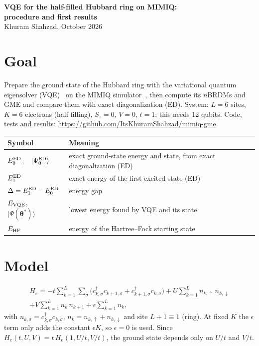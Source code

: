 \documentclass[11pt,a4paper]{article}
\newcommand{\cd}{c^\dagger}
\newcommand{\up}{\uparrow}
\newcommand{\dn}{\downarrow}
\begin{document}
\begin{center}
{\large\bfseries VQE for the half-filled Hubbard ring on MIMIQ:\\ procedure and first results}\\[6pt]
Khuram Shahzad, October 2026
\end{center}

\section{Goal}

Prepare the ground state of the Hubbard ring with the
variational quantum eigensolver (VQE)~\cite{peruzzo} on the MIMIQ simulator~\cite{mimiq}, then compute its
$n$BRDMs and GME and compare them with exact diagonalization (ED).
System: $L = 6$ sites, $K = 6$ electrons (half filling), $S_z = 0$, $V = 0$,
$t = 1$; this needs 12 qubits. Code, tests and results:
\url{https://github.com/ItsKhuramShahzad/mimiq-gme}.

\begin{center}
{\renewcommand{\arraystretch}{1.6}
\begin{tabular}{ll}
  \toprule
  Symbol & Meaning \\
  \midrule
  $E_0^{\rm ED}$,\ \ $|\Psi_0^{\rm ED}\rangle$ & exact ground-state energy and state, from exact diagonalization (ED) \\
  $E_1^{\rm ED}$ & exact energy of the first excited state (ED) \\
  $\Delta = E_1^{\rm ED} - E_0^{\rm ED}$ & energy gap \\
  $E_{\rm VQE}$,\ \ $|\Psi(\boldsymbol\theta^*)\rangle$ & lowest energy found by VQE and its state \\
  $E_{\rm HF}$ & energy of the Hartree--Fock starting state \\
  \bottomrule
\end{tabular}}
\end{center}

\section{Model}

\begin{gather}
H_e = - t \sum_{k=1}^L \sum_{\sigma} \big(\cd_{k,\sigma} c_{k+1,\sigma} + \cd_{k+1,\sigma} c_{k,\sigma}\big)
+ U \sum_{k=1}^L n_{k,\up}\, n_{k,\dn} \nonumber\\
+ V \sum_{k=1}^L n_k\, n_{k+1} + \epsilon \sum_{k=1}^L n_k , \label{eq:H}
\end{gather}
with $n_{k,\sigma} = \cd_{k,\sigma}c_{k,\sigma}$, $n_k = n_{k,\up} + n_{k,\dn}$
and site $L+1 \equiv 1$ (ring). At fixed $K$ the $\epsilon$ term only adds the
constant $\epsilon K$, so $\epsilon = 0$ is used. Since
$H_e(t,U,V) = t\,H_e(1,U/t,V/t)$, the ground state depends only on $U/t$ and $V/t$.
\end{document}

